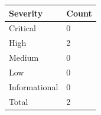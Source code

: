 \documentclass{article}
\begin{document}
                \begin{minipage}{.40\textwidth}
                \renewcommand{\arraystretch}{1.63}
                \begin{tabular}{|p{11em}|>{\centering\arraybackslash}p{6em}|}
                \hline
                \normalsize \cellcolor{black!10} \textbf{Severity} & \normalsize \cellcolor{black!10} \rule{0pt}{5ex} \textbf{Count} \\
                 \hline
                 \normalsize Critical &   \normalsize \cellcolor{critical} \rule{0pt}{4ex} 0  \\
                 \hline
                 \normalsize High & \normalsize \cellcolor{high} \rule{0pt}{4ex} 2 \\
                 \hline
                 \normalsize Medium & \normalsize \cellcolor{medium} \rule{0pt}{4ex} 0 \\
                 \hline
                 \normalsize Low & \normalsize \cellcolor{low} \rule{0pt}{4ex} 0 \\
                 \hline
                 \normalsize Informational & \normalsize \cellcolor{info} \rule{0pt}{4ex} 0 \\
                 \hline
                 \normalsize Total & \normalsize \cellcolor{total} \rule{0pt}{5ex} 2 \\
                 \hline    
                \end{tabular}
                \end{minipage}

 

            \newpage
\end{document}

